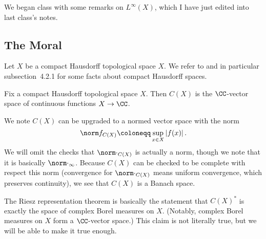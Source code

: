 \documentclass[../notes.tex]{subfiles}
\begin{document}
We began class with some remarks on $L^\infty(X)$, which I have just edited into last class's notes.

\subsection{The Moral}
Let $X$ be a compact Hausdorff topological space $X$. We refer to \cite{elber-top} and in particular subsection~4.2.1 for some facts about compact Hausdorff spaces.
\begin{notation}
	Fix a compact Hausdorff topological space $X$. Then $C(X)$ is the $\CC$-vector space of continuous functions $X\to\CC$.
\end{notation}
\begin{remark}
	We note $C(X)$ can be upgraded to a normed vector space with the norm
	\[\norm f_{C(X)}\coloneqq\sup_{x\in X}\left|f(x)\right|.\]
	We will omit the checks that $\norm\cdot_{C(X)}$ is actually a norm, though we note that it is basically $\norm\cdot_\infty$. Because $C(X)$ can be checked to be complete with respect this norm (convergence for $\norm\cdot_{C(X)}$ means uniform convergence, which preserves continuity), we see that $C(X)$ is a Banach space.
\end{remark}
The Riesz representation theorem is basically the statement that $C(X)^*$ is exactly the space of complex Borel measures on $X$. (Notably, complex Borel measures on $X$ form a $\CC$-vector space.) This claim is not literally true, but we will be able to make it true enough.
\end{document}
